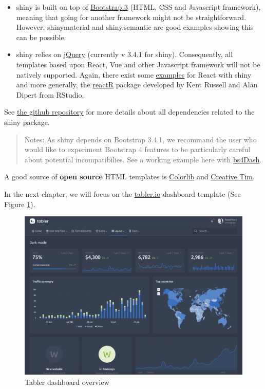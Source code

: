 \documentclass[]{book}
\providecommand{\tightlist}{%
  \setlength{\itemsep}{0pt}\setlength{\parskip}{0pt}}
\begin{document}
\begin{itemize}
\tightlist
\item
  shiny is built on top of \href{https://getbootstrap.com/docs/3.3/}{Bootstrap 3} (HTML, CSS and Javascript framework), meaning that going for another framework might not be straightforward. However, shinymaterial and shiny.semantic are good examples showing this can be possible.
\item
  shiny relies on \href{https://jquery.com}{jQuery} (currently v 3.4.1 for shiny). Consequently, all templates based upon React, Vue and other Javascript framework will not be natively supported. Again, there exist some \href{https://github.com/alandipert/react-widget-demo/blob/master/app.R}{examples} for React with shiny and more generally,
  the \href{https://react-r.github.io/reactR/}{reactR} package developed by Kent Russell and Alan Dipert from RStudio.
\end{itemize}

See \href{https://github.com/rstudio/shiny/tree/master/inst/www/shared}{the github repository} for more details about all dependencies related to the shiny package.

\begin{quote}
Notes: As shiny depends on Bootstrap 3.4.1, we recommand the user who would like to experiment Bootstrap 4 features to be particularly careful about potential incompatibilies. See a working example here with \href{https://github.com/RinteRface/bs4Dash}{bs4Dash}.
\end{quote}

A good source of \textbf{open source} HTML templates is \href{https://colorlib.com}{Colorlib} and \href{https://www.creative-tim.com/bootstrap-themes/free}{Creative Tim}.

In the next chapter, we will focus on the \href{https://preview-dev.tabler.io/layout-dark.html}{tabler.io} dashboard template (See Figure \ref{fig:tabler-dark}).

\begin{figure}
\includegraphics[width=34.33in]{images/practice/tabler-dark} \caption{Tabler dashboard overview}\label{fig:tabler-dark}
\end{figure}
\end{document}
